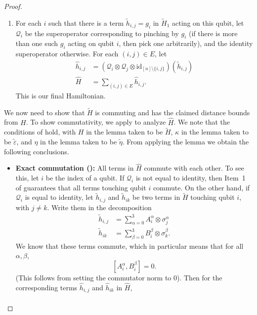\documentclass[11pt]{article}
\theoremstyle{plain}
\newcommand{\eps}{\varepsilon}
\newcommand{\cQ}{\mathcal{Q}}
\begin{document}
\begin{proof}
\begin{enumerate}
  \item For each $i$ such that there is a term $\tilde{h}_{i,j} = g_i$ in $\tilde{H}_1$ acting on this qubit, let $\mathcal{Q}_i$ be the superoperator corresponding to pinching by $g_i$ (if there is more than one such $g_i$ acting on qubit $i$, then pick one arbitrarily), and the identity superoperator otherwise. For each $(i,j)\in E$, let 
    \begin{align*} 
    \hat{h}_{i,j} &= (\cQ_i \otimes \cQ_j \otimes \mathrm{id}_{[n] \setminus \{i,j\}})(\tilde{h}_{i,j}) \\
    \hat{H} & = \sum_{(i,j) \in E} \hat{h}_{i,j}.
    \end{align*}
    This is our final Hamiltonian.
        \end{enumerate}

    We now need to show that $\tilde{H}$ is commuting and has the claimed distance bounds from $H$. To show commutativity, we apply  to analyze $\hat{H}$. We note that the conditions of  hold, with $H$ in the lemma taken to be $\tilde{H}$, $\kappa$ in the lemma taken to be $\tilde{\eps}$, and $\eta$ in the lemma taken to be $\tilde{\eta}$. From applying the lemma we obtain the following conclusions.
    \begin{itemize}
        \item \textbf{Exact commutation ():} All terms in $\hat{H}$ commute with each other. To see this, let $i$ be the index of a qubit. If $\mathcal{Q}_i$ is not equal to identity, then Item~1 of  guarantees that all terms touching qubit $i$ commute. On the other hand, if $\mathcal{Q}_i$ is equal to identity, let $\tilde{h}_{i,j}$ and $\tilde{h}_{ik}$ be two terms in $\tilde{H}$ touching qubit $i$, with $j \neq k$. Write them in the decomposition
        \begin{align*}
            \tilde{h}_{i,j} &= \sum_{\alpha=0}^3 A_i^\alpha \otimes \sigma_j^\alpha \\
            \tilde{h}_{ik} &= \sum_{\beta=0}^3 B_i^\beta \otimes \sigma_k^\beta.
        \end{align*}
        We know that these terms commute, which in particular means that for all $\alpha, \beta$,
        \[ [A_i^\alpha, B_i^\beta] = 0.\]
        (This follows from  setting the commutator norm to $0$). 
        Then for the corresponding terms $\hat{h}_{i,j}$ and $\hat{h}_{ik}$ in $\hat{H}$,
        \begin{align*}

\end{align*}
\end{itemize}
\end{proof}
\end{document}

